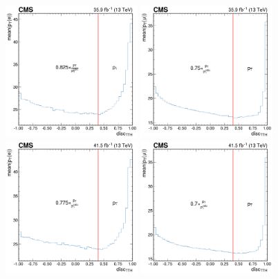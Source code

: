 \begin{figure}
  \centering
  \includegraphics[width=0.45\textwidth]{cone_correction/corrected_Electron_0p4_2016.png} \hfill
  \includegraphics[width=0.45\textwidth]{cone_correction/corrected_Muon_0p4_2016.png} \\
  \includegraphics[width=0.45\textwidth]{cone_correction/corrected_Electron_0p4_2017.png} \hfill
  \includegraphics[width=0.45\textwidth]{cone_correction/corrected_Muon_0p4_2017.png} \\

\end{figure}
